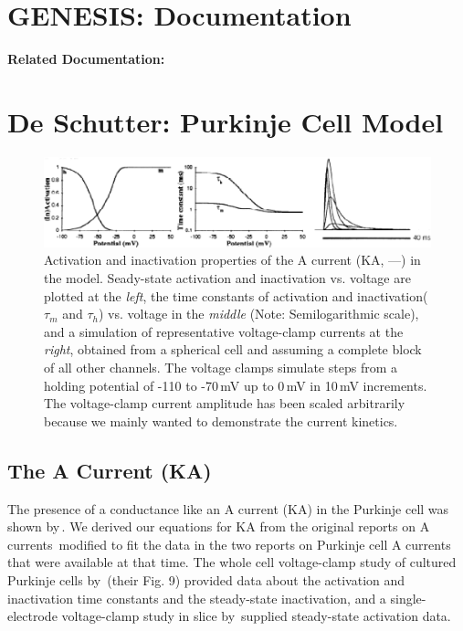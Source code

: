 \documentclass[12pt]{article}
\begin{document}
\section*{GENESIS: Documentation}

{\bf Related Documentation:}

\section*{De Schutter: Purkinje Cell Model}

\begin{figure}[h]
\centering
   \includegraphics[scale=0.75]{figures/DS1.2F.eps}
   \caption{Activation and inactivation properties of the A current (KA, ---) in the model. Seady-state activation and inactivation vs. voltage are plotted at the {\em left}, the time constants of activation and inactivation($\tau_m$ and $\tau_h$) vs. voltage in the {\em middle} (Note: Semilogarithmic scale), and a simulation of representative voltage-clamp currents at the {\em right}, obtained from a spherical cell and assuming a complete block of all other channels. The voltage clamps simulate steps from a holding potential of -110 to -70\,mV up to 0\,mV in 10\,mV increments. The voltage-clamp current amplitude has been scaled arbitrarily because we mainly wanted to demonstrate the current kinetics.}
   \label{fig:DS1.2F}
\end{figure}

\subsection*{The A Current (KA)}

The presence of a conductance like an A current (KA) in the Purkinje cell was shown by\,\cite{Hounsgaard:1988nx}. We derived our equations for KA from the original reports on A currents\,\cite{Connor:1971tg, De-Schutter:1986hc} modified to fit the data in the two reports on Purkinje cell A currents that were available at that time. The whole cell voltage-clamp study of cultured Purkinje cells by\,\cite{Hirano:1989uq} (their Fig. 9) provided data about the activation and inactivation time constants and the steady-state inactivation, and a single-electrode voltage-clamp study in slice by\,\cite{Li:1990ij} supplied steady-state activation data.
\end{document}
